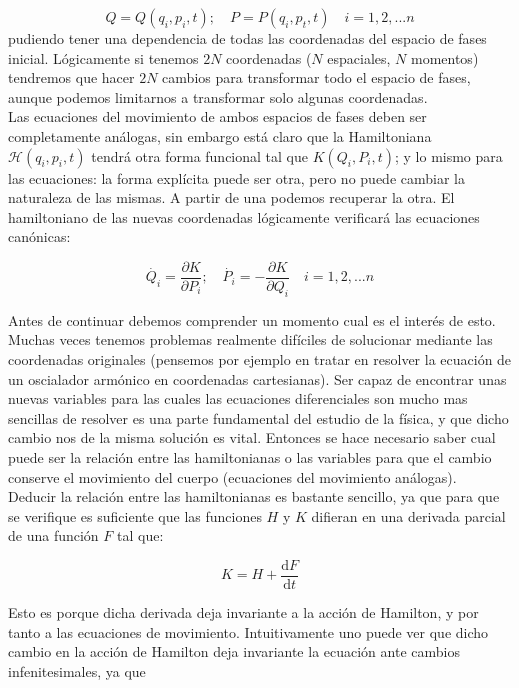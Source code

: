 \documentclass[12pt,a4paper]{article}
\numberwithin{equation}{section}
\numberwithin{figure}{section}
\newcommand{\parciales}[2]{\frac{\partial #1}{\partial #2}}
\newcommand{\D}{\mathrm{d}}
\newcommand{\derivadas}[2]{\frac{\D #1}{\D #2}}
\newcommand{\Hcal}{\mathcal{H}}
\begin{document}
\begin{equation}
Q = Q (q_i,p_i,t); \quad P = P (q_i,p_t,t) \quad i = 1,2,...n
\end{equation}
pudiendo tener una dependencia de todas las coordenadas del espacio de fases inicial. Lógicamente si tenemos $2N$ coordenadas ($N$ espaciales, $N$ momentos) tendremos que hacer $2N$ cambios para transformar todo el espacio de fases, aunque podemos limitarnos a transformar solo algunas coordenadas. \\

Las ecuaciones del movimiento de ambos espacios de fases deben ser completamente análogas, sin embargo está claro que la Hamiltoniana $\Hcal(q_i,p_i,t)$ tendrá otra forma funcional tal que $K(Q_i,P_i,t)$; y lo mismo para las ecuaciones: la forma explícita puede ser otra, pero no puede cambiar la naturaleza de las mismas. A partir de una podemos recuperar la otra. El hamiltoniano de las nuevas coordenadas lógicamente verificará las ecuaciones canónicas:
 
\begin{equation}
\dot{Q_i} = \parciales{K}{P_i}; \quad \dot{P_i} = - \parciales{K}{Q_i} \quad i =1,2,...n \label{Ec:1.1-Ecuaciones-canonicas-K}
\end{equation}

Antes de continuar debemos comprender un momento cual es el interés de esto. Muchas veces tenemos problemas realmente difíciles de solucionar mediante las coordenadas originales (pensemos por ejemplo en tratar en resolver la ecuación de un oscialador armónico en coordenadas cartesianas). Ser capaz de encontrar unas nuevas variables para las cuales las ecuaciones diferenciales son mucho mas sencillas de resolver es una parte fundamental del estudio de la física, y que dicho cambio nos de la misma solución es vital. Entonces se hace necesario saber cual puede ser la relación entre las hamiltonianas o las variables para que el cambio conserve el movimiento del cuerpo (ecuaciones del movimiento análogas). \\

Deducir la relación entre las hamiltonianas es bastante sencillo, ya que para que se verifique es suficiente que las funciones $H$ y $K$ difieran en una derivada parcial de una función $F$ tal que:

\begin{equation}
K = H + \derivadas{F}{t} \label{Ec:1.1-K-H}
\end{equation}

Esto es porque dicha derivada deja invariante a la acción de Hamilton, y por tanto a las ecuaciones de movimiento. Intuitivamente uno puede ver que dicho cambio en la acción de Hamilton deja invariante la ecuación ante cambios infenitesimales, ya que
\end{document}
